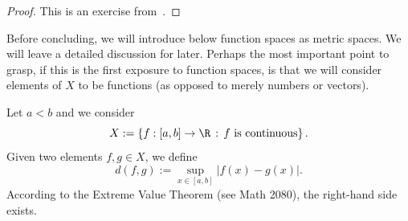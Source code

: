 \begin{proof}
	This is an exercise from~.
\end{proof}
Before concluding, we will introduce below function spaces as metric spaces. We will leave a detailed discussion for later. Perhaps the most important point to grasp, if this is the first exposure to function spaces, is that we will consider elements of $X$ to be functions (as opposed to merely numbers or vectors).
\begin{eg}
	Let $a<b$ and we consider
	\[
	X:= \left\{f:[a,b]\to \R\, : \, f\text{ is continuous}\right\}.
	\]
	Given two elements $f,g\in X$, we define
	\[
	d(f,g):= \sup_{x\in[a,b]}|f(x) - g(x)|.
	\]
	According to the Extreme Value Theorem (see Math 2080), the right-hand side exists.
\end{eg}